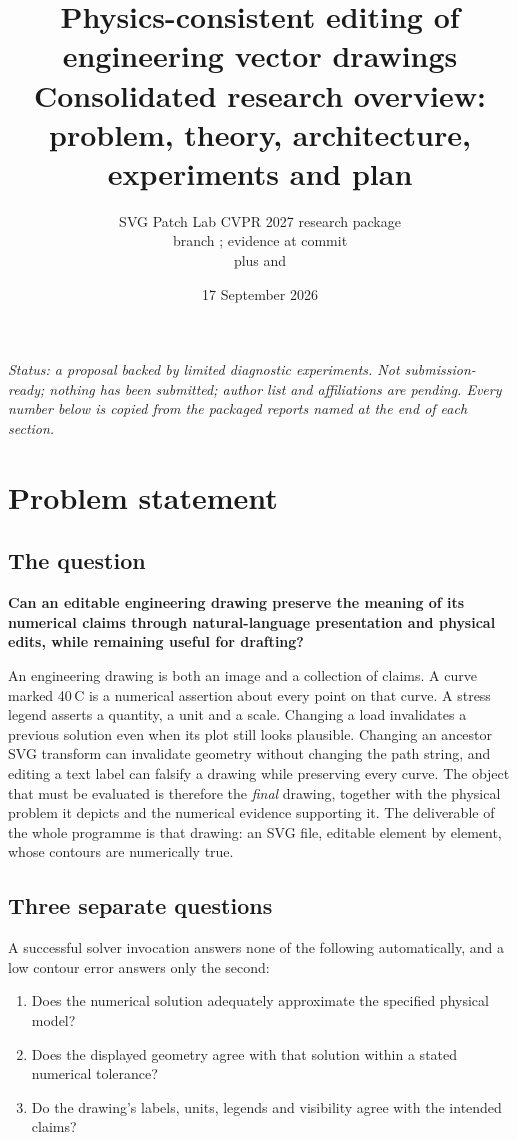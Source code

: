 \documentclass[11pt,a4paper]{article}
\title{\color{researchblue}\LARGE Physics-consistent editing of engineering vector drawings\\[6pt]
\Large Consolidated research overview: problem, theory, architecture, experiments and plan}
\author{SVG Patch Lab \quad\textbullet\quad CVPR 2027 research package\\
\small branch \code{cvpr2027-research-package}; evidence at commit \code{cb3ab44}\\
\small plus \code{runs/colab-a100-20260916} and \code{runs/blackwell-20260917}}
\date{17 September 2026}
\newcommand{\degC}{\,\textdegree C}
\begin{document}
\maketitle

\begin{center}
\small\itshape
Status: a proposal backed by limited diagnostic experiments. Not submission-ready; nothing has been submitted; author list and affiliations are pending. Every number below is copied from the packaged reports named at the end of each section.
\end{center}

\tableofcontents

\section{Problem statement}

\subsection{The question}

\textbf{Can an editable engineering drawing preserve the meaning of its numerical claims through natural-language presentation and physical edits, while remaining useful for drafting?}

An engineering drawing is both an image and a collection of claims. A curve marked 40\degC{} is a numerical assertion about every point on that curve. A stress legend asserts a quantity, a unit and a scale. Changing a load invalidates a previous solution even when its plot still looks plausible. Changing an ancestor SVG transform can invalidate geometry without changing the path string, and editing a text label can falsify a drawing while preserving every curve. The object that must be evaluated is therefore the \emph{final} drawing, together with the physical problem it depicts and the numerical evidence supporting it. The deliverable of the whole programme is that drawing: an SVG file, editable element by element, whose contours are numerically true.

\subsection{Three separate questions}

A successful solver invocation answers none of the following automatically, and a low contour error answers only the second:
\begin{enumerate}
  \item Does the numerical solution adequately approximate the specified physical model?
  \item Does the displayed geometry agree with that solution within a stated numerical tolerance?
  \item Do the drawing's labels, units, legends and visibility agree with the intended claims?
\end{enumerate}
\end{document}
